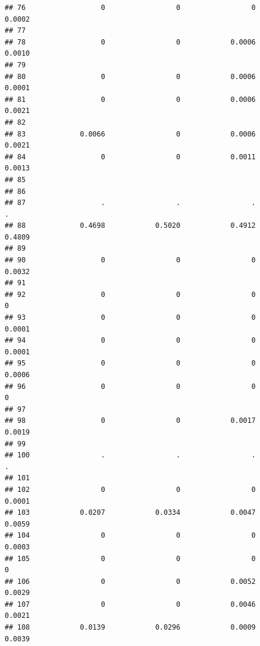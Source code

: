 \documentclass[
]{article}
\begin{document}
\begin{verbatim}
## 76                  0                 0                 0            0.0002
## 77                                                                         
## 78                  0                 0            0.0006            0.0010
## 79                                                                         
## 80                  0                 0            0.0006            0.0001
## 81                  0                 0            0.0006            0.0021
## 82                                                                         
## 83             0.0066                 0            0.0006            0.0021
## 84                  0                 0            0.0011            0.0013
## 85                                                                         
## 86                                                                         
## 87                  .                 .                 .                 .
## 88             0.4698            0.5020            0.4912            0.4809
## 89                                                                         
## 90                  0                 0                 0            0.0032
## 91                                                                         
## 92                  0                 0                 0                 0
## 93                  0                 0                 0            0.0001
## 94                  0                 0                 0            0.0001
## 95                  0                 0                 0            0.0006
## 96                  0                 0                 0                 0
## 97                                                                         
## 98                  0                 0            0.0017            0.0019
## 99                                                                         
## 100                 .                 .                 .                 .
## 101                                                                        
## 102                 0                 0                 0            0.0001
## 103            0.0207            0.0334            0.0047            0.0059
## 104                 0                 0                 0            0.0003
## 105                 0                 0                 0                 0
## 106                 0                 0            0.0052            0.0029
## 107                 0                 0            0.0046            0.0021
## 108            0.0139            0.0296            0.0009            0.0039

\end{verbatim}
\end{document}

